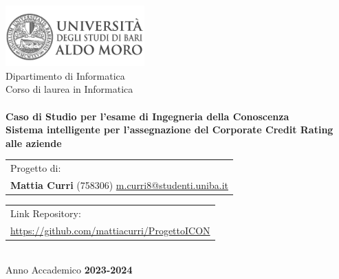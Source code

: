 \begin{titlepage}
    \begin{center}
        \includegraphics[width=0.4\textwidth]{img/logo_uniba}\\
        \vspace{1cm}
        {\large Dipartimento di Informatica}\\
        \vspace{1cm}
        {\large Corso di laurea in Informatica}\\
        \hrulefill \\
        \vspace{2cm}
        {\large \textbf{Caso di Studio per l'esame di Ingegneria della Conoscenza}}\\
        \vspace{2cm}
        {\LARGE\textbf{Sistema intelligente per l'assegnazione del Corporate Credit Rating alle aziende}}\\
        \vspace{2cm}

       \begin{table}[ht]
          \centering
          \begin{tabularx}{\textwidth}{@{}X@{}}
              Progetto di: \\
              \textbf{Mattia Curri} (758306) \href{mailto:m.curri8@studenti.uniba.it}{m.curri8@studenti.uniba.it} \\
          \end{tabularx}
      \end{table}
      \vspace{1cm}

      \begin{table}[ht]
        \centering
        \begin{tabularx}{\textwidth}{@{}X@{}}
            Link Repository: \\
            \href{https://github.com/mattiacurri/ProgettoICON}{https://github.com/mattiacurri/ProgettoICON} \\
        \end{tabularx}
    \end{table}

        \vspace{4cm}
        \hrulefill \\
        \vspace{1cm}
        {\large Anno Accademico \textbf{2023-2024}}
    \end{center}
\end{titlepage}